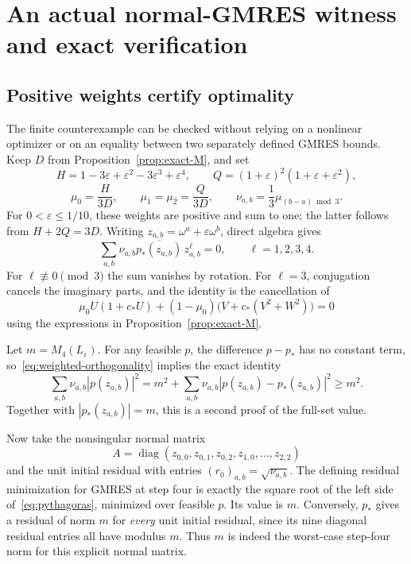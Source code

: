 \documentclass[11pt,a4paper]{article}
\theoremstyle{remark}
\newcommand{\eps}{\varepsilon}
\newcommand{\om}{\omega}
\begin{document}
\section{An actual normal-GMRES witness and exact verification}
\subsection{Positive weights certify optimality}
The finite counterexample can be checked without relying on a nonlinear
optimizer or on an equality between two separately defined GMRES bounds.
Keep $D$ from Proposition~\ref{prop:exact-M}, and set
\[
 H=1-3\eps+\eps^2-3\eps^3+\eps^4,
 \qquad Q=(1+\eps)^2(1+\eps+\eps^2),
\]
\[
 \mu_0=\frac{H}{3D},\qquad \mu_1=\mu_2=\frac{Q}{3D},
 \qquad \nu_{a,b}=\frac13\mu_{(b-a)\bmod3}.
\]
For $0<\eps\le1/10$, these weights are positive and sum to one; the latter
follows from $H+2Q=3D$.
Writing $z_{a,b}=\om^a+\eps\om^b$, direct algebra gives
\begin{equation}\label{eq:weighted-orthogonality}
 \sum_{a,b}\nu_{a,b}\overline{p_*(z_{a,b})}\,z_{a,b}^{\ell}=0,
 \qquad \ell=1,2,3,4.
\end{equation}
For $\ell\not\equiv0\pmod3$ the sum vanishes by rotation. For $\ell=3$,
conjugation cancels the imaginary parts, and the identity is the cancellation
of
\[
 \mu_0 U(1+c_*U)+(1-\mu_0)\bigl(V+c_*(V^2+W^2)\bigr)=0
\]
using the expressions in Proposition~\ref{prop:exact-M}.

Let $m=M_4(L_\eps)$. For any feasible $p$, the difference $p-p_*$ has no
constant term, so~\eqref{eq:weighted-orthogonality} implies the exact identity
\begin{equation}\label{eq:pythagoras}
 \sum_{a,b}\nu_{a,b}|p(z_{a,b})|^2
 =m^2+\sum_{a,b}\nu_{a,b}|p(z_{a,b})-p_*(z_{a,b})|^2\ge m^2.
\end{equation}
Together with $|p_*(z_{a,b})|=m$, this is a second proof of the full-set value.

Now take the nonsingular normal matrix
\[
 A=\operatorname{diag}(z_{0,0},z_{0,1},z_{0,2},z_{1,0},\ldots,z_{2,2})
\]
and the unit initial residual with entries $(r_0)_{a,b}=\sqrt{\nu_{a,b}}$.
The defining residual minimization for GMRES at step four is exactly the
square root of the left side of~\eqref{eq:pythagoras}, minimized over feasible
$p$. Its value is $m$. Conversely, $p_*$ gives a residual of norm $m$ for
\emph{every} unit initial residual, since its nine diagonal residual entries
all have modulus $m$. Thus $m$ is indeed the worst-case step-four norm for
this explicit normal matrix.
\end{document}
